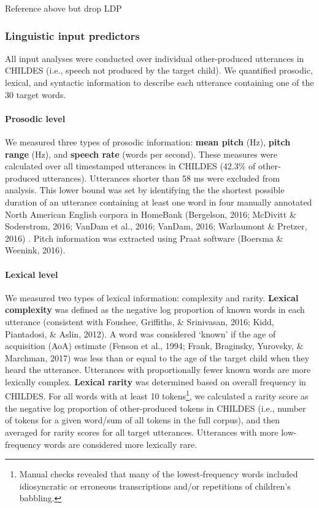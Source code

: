 \documentclass[10pt, letterpaper]{article}
\begin{document}
Reference above but drop LDP

\hypertarget{linguistic-input-predictors}{%
\subsubsection{Linguistic input
predictors}\label{linguistic-input-predictors}}

All input analyses were conducted over individual other-produced
utterances in CHILDES (i.e., speech not produced by the target child).
We quantified prosodic, lexical, and syntactic information to describe
each utterance containing one of the 30 target words.

\hypertarget{prosodic-level}{%
\paragraph{Prosodic level}\label{prosodic-level}}

We measured three types of prosodic information: \textbf{mean pitch}
(Hz), \textbf{pitch range} (Hz), and \textbf{speech rate} (words per
second). These measures were calculated over all timestamped utterances
in CHILDES (42.3\% of other-produced utterances). Utterances shorter
than 58 ms were excluded from analysis. This lower bound was set by
identifying the the shortest possible duration of an utterance
containing at least one word in four manually annotated North American
English corpora in HomeBank (Bergelson, 2016; McDivitt \& Soderstrom,
2016; VanDam et al., 2016; VanDam, 2016; Warlaumont \& Pretzer, 2016) .
Pitch information was extracted using Praat software (Boersma \&
Weenink, 2016).

\hypertarget{lexical-level}{%
\paragraph{Lexical level}\label{lexical-level}}

We measured two types of lexical information: complexity and rarity.
\textbf{Lexical complexity} was defined as the negative log proportion
of known words in each utterance (consistent with Foushee, Griffiths, \&
Srinivasan, 2016; Kidd, Piantadosi, \& Aslin, 2012). A word was
considered `known' if the age of acquisition (AoA) estimate (Fenson et
al., 1994; Frank, Braginsky, Yurovsky, \& Marchman, 2017) was less than
or equal to the age of the target child when they heard the utterance.
Utterances with proportionally fewer known words are more lexically
complex. \textbf{Lexical rarity} was determined based on overall
frequency in CHILDES. For all words with at least 10 tokens\footnote{Manual
  checks revealed that many of the lowest-frequency words included
  idiosyncratic or erroneous transcriptions and/or repetitions of
  children's babbling.}, we calculated a rarity score as the negative
log proportion of other-produced tokens in CHILDES (i.e., number of
tokens for a given word/sum of all tokens in the full corpus), and then
averaged for rarity scores for all target utterances. Utterances with
more low-frequency words are considered more lexically rare.
\end{document}
